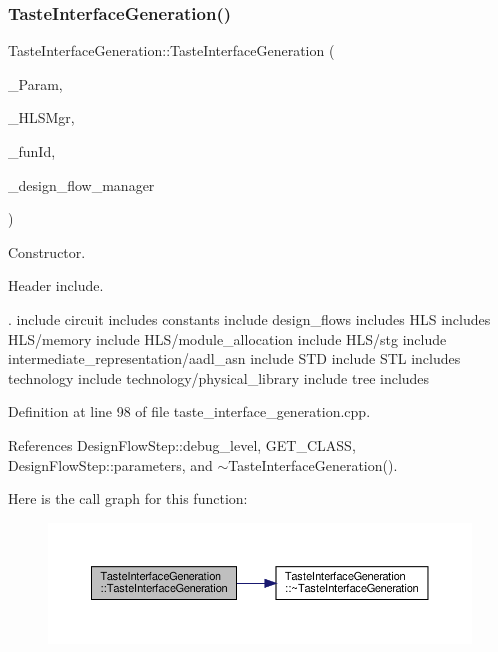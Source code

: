 \subsubsection{\texorpdfstring{Taste\+Interface\+Generation()}{TasteInterfaceGeneration()}}
{\footnotesize\ttfamily Taste\+Interface\+Generation\+::\+Taste\+Interface\+Generation (\begin{DoxyParamCaption}\item[{const \hyperlink{Parameter_8hpp_a37841774a6fcb479b597fdf8955eb4ea}{Parameter\+Const\+Ref}}]{\+\_\+\+Param,  }\item[{const \hyperlink{hls__manager_8hpp_acd3842b8589fe52c08fc0b2fcc813bfe}{H\+L\+S\+\_\+manager\+Ref}}]{\+\_\+\+H\+L\+S\+Mgr,  }\item[{unsigned int}]{\+\_\+fun\+Id,  }\item[{const Design\+Flow\+Manager\+Const\+Ref}]{\+\_\+design\+\_\+flow\+\_\+manager }\end{DoxyParamCaption})}



Constructor. 

Header include.

. include circuit includes constants include design\+\_\+flows includes H\+LS includes H\+L\+S/memory include H\+L\+S/module\+\_\+allocation include H\+L\+S/stg include intermediate\+\_\+representation/aadl\+\_\+asn include S\+TD include S\+TL includes technology include technology/physical\+\_\+library include tree includes 

Definition at line 98 of file taste\+\_\+interface\+\_\+generation.\+cpp.



References Design\+Flow\+Step\+::debug\+\_\+level, G\+E\+T\+\_\+\+C\+L\+A\+SS, Design\+Flow\+Step\+::parameters, and $\sim$\+Taste\+Interface\+Generation().

Here is the call graph for this function\+:
\nopagebreak
\begin{figure}[H]
\begin{center}
\leavevmode
\includegraphics[width=350pt]{dc/d30/classTasteInterfaceGeneration_a0da843c90610920daf5855c8f2fba111_cgraph}
\end{center}
\end{figure}
\mbox{\label{classTasteInterfaceGeneration_a32597bb37a797ccd8b851f497bfd47b0}} 
